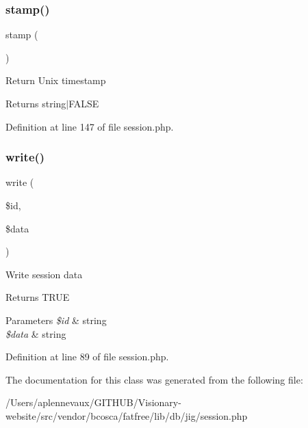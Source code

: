 \subsubsection{\texorpdfstring{stamp()}{stamp()}}
{\footnotesize\ttfamily stamp (\begin{DoxyParamCaption}{ }\end{DoxyParamCaption})}

Return Unix timestamp \begin{DoxyReturn}{Returns}
string$\vert$\+F\+A\+L\+SE 
\end{DoxyReturn}


Definition at line 147 of file session.\+php.

\hypertarget{class_d_b_1_1_jig_1_1_session_a5f277b5f0e4e2154cddc9a3a0d2bf57d}{}\label{class_d_b_1_1_jig_1_1_session_a5f277b5f0e4e2154cddc9a3a0d2bf57d} 
\subsubsection{\texorpdfstring{write()}{write()}}
{\footnotesize\ttfamily write (\begin{DoxyParamCaption}\item[{}]{\$id,  }\item[{}]{\$data }\end{DoxyParamCaption})}

Write session data \begin{DoxyReturn}{Returns}
T\+R\+UE 
\end{DoxyReturn}

\begin{DoxyParams}{Parameters}
{\em \$id} & string \\
\hline
{\em \$data} & string \\
\hline
\end{DoxyParams}


Definition at line 89 of file session.\+php.



The documentation for this class was generated from the following file\+:\begin{DoxyCompactItemize}
\item 
/\+Users/aplennevaux/\+G\+I\+T\+H\+U\+B/\+Visionary-\/website/src/vendor/bcosca/fatfree/lib/db/jig/session.\+php\end{DoxyCompactItemize}
